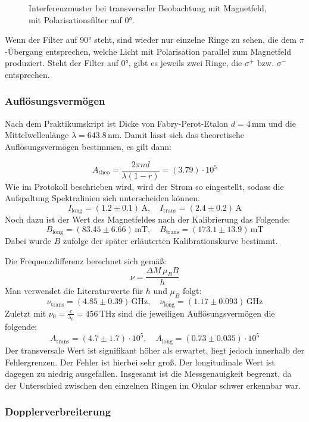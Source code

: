 \documentclass{article}
\begin{document}
\begin{multicols}{2}
\begin{figure}[H]
  \caption{Interferenzmuster bei transversaler Beobachtung mit Magnetfeld, mit Polarisationsfilter auf \ang{0}.}
  \label{fig:zeeman-transveral-mit-0}
\end{figure}
Wenn der Filter auf \ang{90} steht, sind wieder nur einzelne Ringe zu sehen, die dem $\pi$-Übergang entsprechen,
welche Licht mit Polarisation parallel zum Magnetfeld produziert.
Steht der Filter auf \ang{0}, gibt es jeweils zwei Ringe, die $\sigma^+$ bzw. $\sigma^-$ entsprechen.

\subsubsection{Auflösungsvermögen}

Nach dem Praktikumskript ist Dicke von Fabry-Perot-Etalon 
$d = 4 \, \text{mm}$ und die Mittelwellenlänge $\lambda = 643.8 \, \text{nm}$.
Damit lässt sich das theoretische Auflösungsvermögen bestimmen, es gilt dann:

\[
A_{\text{theo}} = \frac{2 \pi n d}{\lambda (1 - r)} = (3.79) \cdot 10^5
\]
Wie im Protokoll beschrieben wird, wird der Strom so eingestellt, sodass die Aufspaltung
Spektralinien sich unterscheiden können.
\[
I_{\text{long}} = (1.2 \pm 0.1) \, \text{A}, \quad I_{\text{trans}} = (2.4 \pm 0.2) \, \text{A}
\]
Noch dazu ist der Wert des Magnetfeldes nach der Kalibrierung das Folgende: 
\[
B_{\text{long}} = ( 83.45 \pm 6.66) \, \text{mT}, \quad B_{\text{trans}} = (173.1 \pm 13.9) \, \text{mT}
\]
Dabei wurde $B$ zufolge der später erläuterten Kalibrationskurve bestimmt.

Die Frequenzdifferenz berechnet sich gemäß:
\[
\nu = \frac{\Delta M \, \mu_B B}{h}
\]
Man verwendet die Literaturwerte für $h$ und $\mu_B$  folgt:
\[
\nu_{\text{trans}} = (4.85 \pm 0.39) \, \text{GHz}, \quad \nu_{\text{long}} = (1.17 \pm 0.093) \, \text{GHz}
\]
Zuletzt mit $\nu_0 = \frac{c}{\lambda_0} = 456 \, \text{THz}$ sind die jeweiligen Auflösungsvermögen die folgende:
\[
A_{\text{trans}} = (4.7 \pm 1.7) \cdot 10^5, \quad A_{\text{long}} = (0.73 \pm 0.035) \cdot 10^5
\]
Der transversale Wert ist signifikant höher als erwartet, liegt jedoch innerhalb der Fehlergrenzen. Der Fehler ist hierbei sehr groß. Der longitudinale Wert ist dagegen zu niedrig ausgefallen. Insgesamt ist die Messgenauigkeit begrenzt, da der Unterschied zwischen den einzelnen Ringen im Okular schwer erkennbar war.

\subsubsection{Dopplerverbreiterung}


\end{multicols}
\end{document}
